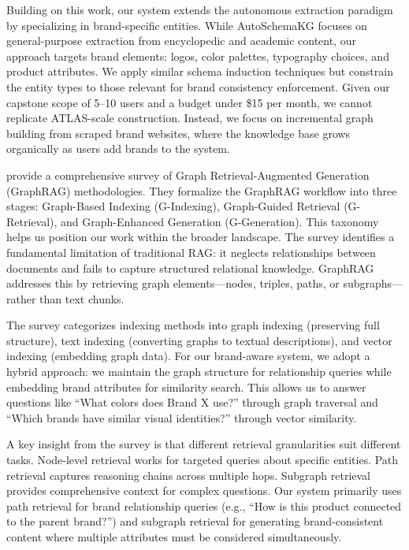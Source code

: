 \documentclass[11pt, twocolumn]{article}
\begin{document}
Building on this work, our system extends the autonomous extraction paradigm by specializing in brand-specific entities. While AutoSchemaKG focuses on general-purpose extraction from encyclopedic and academic content, our approach targets brand elements: logos, color palettes, typography choices, and product attributes. We apply similar schema induction techniques but constrain the entity types to those relevant for brand consistency enforcement. Given our capstone scope of 5--10 users and a budget under \$15 per month, we cannot replicate ATLAS-scale construction. Instead, we focus on incremental graph building from scraped brand websites, where the knowledge base grows organically as users add brands to the system.

\cite{Peng2024} provide a comprehensive survey of Graph Retrieval-Augmented Generation (GraphRAG) methodologies. They formalize the GraphRAG workflow into three stages: Graph-Based Indexing (G-Indexing), Graph-Guided Retrieval (G-Retrieval), and Graph-Enhanced Generation (G-Generation). This taxonomy helps us position our work within the broader landscape. The survey identifies a fundamental limitation of traditional RAG: it neglects relationships between documents and fails to capture structured relational knowledge. GraphRAG addresses this by retrieving graph elements---nodes, triples, paths, or subgraphs---rather than text chunks.

The survey categorizes indexing methods into graph indexing (preserving full structure), text indexing (converting graphs to textual descriptions), and vector indexing (embedding graph data). For our brand-aware system, we adopt a hybrid approach: we maintain the graph structure for relationship queries while embedding brand attributes for similarity search. This allows us to answer questions like ``What colors does Brand X use?'' through graph traversal and ``Which brands have similar visual identities?'' through vector similarity.

A key insight from the survey is that different retrieval granularities suit different tasks. Node-level retrieval works for targeted queries about specific entities. Path retrieval captures reasoning chains across multiple hops. Subgraph retrieval provides comprehensive context for complex questions. Our system primarily uses path retrieval for brand relationship queries (e.g., ``How is this product connected to the parent brand?'') and subgraph retrieval for generating brand-consistent content where multiple attributes must be considered simultaneously.
\end{document}
